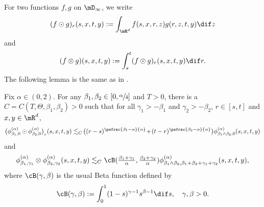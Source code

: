 For two functions $f,g$ on $\mD_\infty$, we write
\[
(f\odot g)_r(s,x,t,y):=\int_{\mR^d} f(s,x,r,z)g(r,z,t,y)\dif z
\]
and\vspace*{-3pt}
\[
(f\otimes g)(s,x,t,y):=\int^t_s(f\odot g)_r(s,x,t,y)\dif r.
\]
The following lemma is the same as in \cite[Lem.\,2.1]{Ch-Zh}.
\begin{lemma}\label{Le09} Fix $\alpha\in (0,2) $.
For any $\beta_1,\beta_2\in[0,\sfrac{\alpha}{4}]$ and $T>0$,
there is a $C=C(T,\Theta,\beta_1,\beta_2)>0$ such that
for all $\gamma_1>-\beta_1$ and $\gamma_2>-\beta_2$, $r\in[s,t]$ and $x,y\in \mR^d $,%
\begin{equation}\label{eq30}
\bigl(\phi^{(\alpha)}_{\beta_1,0}\odot\phi^{(\alpha)}_{\beta_2,0}\bigr)_r(s,x,t,y)
\lesssim_{C}\! \bigl((r-s)^{\psfrac{\beta_1-\alpha}{\alpha}}\!+\!(t-r)^{\psfrac{\beta_2-\alpha}{\alpha}}\bigr)
\phi^{(\alpha)}_{\beta_1\wedge\beta_2,0}(s,x,t,y)
\end{equation}
and\vspace*{-3pt}
\begin{equation}\label{eq31}
\phi^{(\alpha)}_{\beta_1,\gamma_1}\otimes\phi^{(\alpha)}_{\beta_2,\gamma_2} (s,x,t,y)
\lesssim_{C} \cB(\tfrac{\beta_1+\gamma_1}{\alpha},\tfrac{\beta_2+\gamma_2}{\alpha})
\phi^{(\alpha)}_{\beta_1\wedge\beta_2,\beta_1+\beta_2+\gamma_1+\gamma_2}(s,x,t,y),
\end{equation}
where $\cB(\gamma,\beta)$ is the usual Beta function defined by
\[
\cB(\gamma,\beta):=\int^1_0(1-s)^{\gamma-1}s^{\beta-1}\dif s,\quad \gamma,\beta>0.
\]
\end{lemma}

